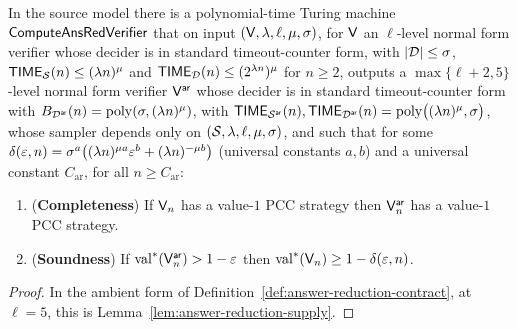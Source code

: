 \begin{theorem}
\label{thm:answer-reduction}
\leanok
In the source model there is a polynomial-time Turing machine $\mathsf{ComputeAnsRedVerifier}$ that on input
$(\mathsf{V}, \lambda, \ell, \mu, \sigma)$, for $\mathsf{V}$ an $\ell$-level normal form
verifier whose decider is in standard timeout-counter form, with
$\left\vert {\mathcal{D}} \right\vert \leq \sigma$, $\mathsf{TIME}_{\mathcal{S}}(n) \leq (\lambda n)^\mu$
and $\mathsf{TIME}_{\mathcal{D}}(n) \leq (2^{\lambda n})^\mu$ for $n \geq 2$, outputs a
$\max\{\ell + 2, 5\}$-level normal form verifier $\mathsf{V}^{\mathsf{ar}}$ whose decider is in standard
timeout-counter form with $B_{\mathcal{D}^{\mathsf{ar}}}(n)=\mathrm{poly}(\sigma,(\lambda n)^\mu)$, with
$\mathsf{TIME}_{\mathcal{S}^{\mathsf{ar}}}(n), \mathsf{TIME}_{\mathcal{D}^{\mathsf{ar}}}(n) = \mathrm{poly}\bigl( (\lambda n)^\mu, \sigma \bigr)$,
whose sampler depends only on $(\mathcal{S}, \lambda, \ell, \mu, \sigma)$, and such that for
some $\delta(\varepsilon, n) = \sigma^a \bigl( (\lambda n)^{\mu a} \varepsilon^b + (\lambda
n)^{-\mu b} \bigr)$ (universal constants $a, b$) and a universal constant
$C_{\mathrm{ar}}$, for all $n \geq C_{\mathrm{ar}}$:
\begin{enumerate}
\item (\textbf{Completeness}) If $\mathsf{V}_n$ has a value-$1$ PCC strategy
  then $\mathsf{V}^{\mathsf{ar}}_n$ has a value-$1$ PCC strategy.
\item (\textbf{Soundness}) If $\mathrm{val}^*(\mathsf{V}^{\mathsf{ar}}_n) > 1 - \varepsilon$ then
  $\mathrm{val}^*(\mathsf{V}_n) \geq 1 - \delta(\varepsilon, n)$.
\end{enumerate}
\end{theorem}

\begin{proof}
\leanok
In the ambient form of Definition~\ref{def:answer-reduction-contract}, at $\ell=5$, this is
Lemma~\ref{lem:answer-reduction-supply}.
\end{proof}

